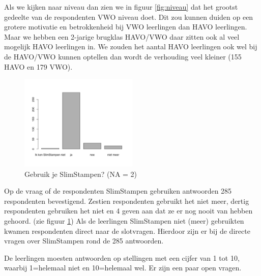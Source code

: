 \documentclass[12pt, a4paper]{article}
\begin{document}
Als we kijken naar niveau dan zien we in figuur \ref*{fig:niveau} dat het grootst gedeelte van de respondenten VWO niveau doet. Dit zou kunnen duiden op een grotere motivatie en betrokkenheid bij VWO leerlingen dan HAVO leerlingen. Maar we hebben een 2-jarige brugklas HAVO/VWO daar zitten ook al veel mogelijk HAVO leerlingen in. We zouden het aantal HAVO leerlingen ook wel bij de HAVO/VWO kunnen optellen dan wordt de verhouding veel kleiner (155 HAVO en 179 VWO).

\begin{figure}[h]
    \centering
    \includegraphics[width=0.5\textwidth]{kenJeSlimstampen.png}
    \caption{Gebruik je SlimStampen? (NA = 2)}
    \label{fig:kenJeSlimstampen}
    \end{figure}
Op de vraag of de respondenten SlimStampen gebruiken antwoorden 285 respondenten bevestigend. Zestien respondenten gebruikt het niet meer, dertig respondenten gebruiken het niet en 4 geven aan dat ze er nog nooit van hebben gehoord. (zie figuur \ref*{fig:kenJeSlimstampen}) Als de leerlingen SlimStampen niet (meer) gebruikten kwamen respondenten direct naar de slotvragen. Hierdoor zijn er bij de directe vragen over SlimStampen rond de 285 antwoorden.

De leerlingen moesten antwoorden op stellingen met een cijfer van 1 tot 10, waarbij 1=helemaal niet en 10=helemaal wel. Er zijn een paar open vragen.
\end{document}
